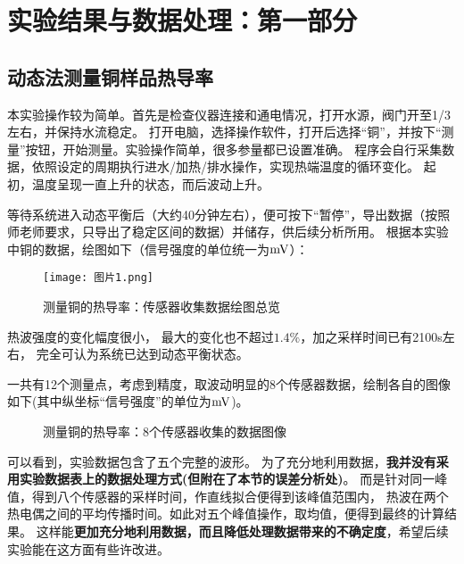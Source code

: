 \documentclass[11pt]{article}
\begin{document}
\section{实验结果与数据处理：第一部分}

\subsection{动态法测量铜样品热导率}
本实验操作较为简单。首先是检查仪器连接和通电情况，打开水源，阀门开至1/3左右，并保持水流稳定。
打开电脑，选择操作软件，打开后选择“铜”，并按下“测量”按钮，开始测量。实验操作简单，很多参量都已设置准确。
程序会自行采集数据，依照设定的周期执行进水/加热/排水操作，实现热端温度的循环变化。
起初，温度呈现一直上升的状态，而后波动上升。

等待系统进入动态平衡后（大约40分钟左右），便可按下“暂停”，导出数据（按照师老师要求，只导出了稳定区间的数据）并储存，供后续分析所用。
根据本实验中铜的数据，绘图如下（信号强度的单位统一为$\rm mV$）：
\begin{figure}[H]
    \centering
    \texttt{[image: 图片1.png]}
    \caption{测量铜的热导率：传感器收集数据绘图总览}
\end{figure}
热波强度的变化幅度很小，
最大的变化也不超过$1.4\%$，加之采样时间已有2100s左右，
完全可认为系统已达到动态平衡状态。

一共有12个测量点，考虑到精度，取波动明显的8个传感器数据，绘制各自的图像如下(其中纵坐标“信号强度”的单位为$\rm mV$)。

\newpage
\begin{figure}[H] 
    \centering
    \caption{测量铜的热导率：8个传感器收集的数据图像}
\end{figure}

可以看到，实验数据包含了五个完整的波形。
为了充分地利用数据，\textbf{我并没有采用实验数据表上的数据处理方式(但附在了本节的误差分析处)}。
而是针对同一峰值，得到八个传感器的采样时间，作直线拟合便得到该峰值范围内，
热波在两个热电偶之间的平均传播时间。如此对五个峰值操作，取均值，便得到最终的计算结果。
这样能\textbf{更加充分地利用数据，而且降低处理数据带来的不确定度}，希望后续实验能在这方面有些许改进。
\end{document}
